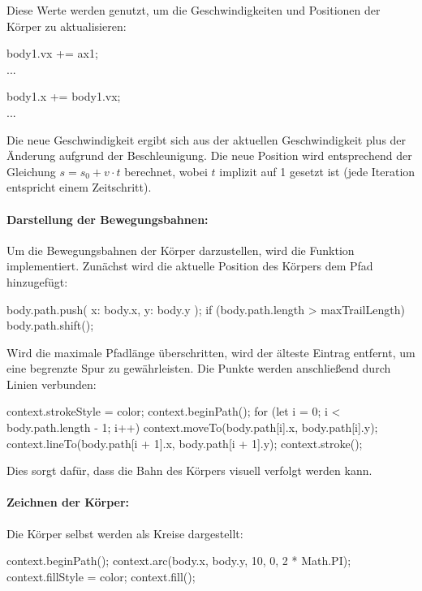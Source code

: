 \documentclass[a4paper,12pt,twoside]{article}
\begin{document}
Diese Werte werden genutzt, um die Geschwindigkeiten und Positionen der Körper zu aktualisieren:

\begin{javascript}
body1.vx += ax1;
\\...

body1.x += body1.vx;
\\...
\end{javascript}

Die neue Geschwindigkeit ergibt sich aus der aktuellen Geschwindigkeit plus der Änderung aufgrund der Beschleunigung. Die neue Position wird entsprechend der Gleichung \( s = s_0 + v \cdot t \) berechnet, wobei \( t \) implizit auf 1 gesetzt ist (jede Iteration entspricht einem Zeitschritt).

\paragraph{Darstellung der Bewegungsbahnen:}
Um die Bewegungsbahnen der Körper darzustellen, wird die Funktion  implementiert. Zunächst wird die aktuelle Position des Körpers dem Pfad hinzugefügt:

\begin{javascript}
body.path.push({ x: body.x, y: body.y });
if (body.path.length > maxTrailLength) body.path.shift();
\end{javascript}

Wird die maximale Pfadlänge überschritten, wird der älteste Eintrag entfernt, um eine begrenzte Spur zu gewährleisten. Die Punkte werden anschließend durch Linien verbunden:

\begin{javascript}
context.strokeStyle = color;
context.beginPath();
for (let i = 0; i < body.path.length - 1; i++) {
    context.moveTo(body.path[i].x, body.path[i].y);
    context.lineTo(body.path[i + 1].x, body.path[i + 1].y);
}
context.stroke();
\end{javascript}

Dies sorgt dafür, dass die Bahn des Körpers visuell verfolgt werden kann.

\paragraph{Zeichnen der Körper:}
Die Körper selbst werden als Kreise dargestellt:

\begin{javascript}
context.beginPath();
context.arc(body.x, body.y, 10, 0, 2 * Math.PI);
context.fillStyle = color;
context.fill();
\end{javascript}
\end{document}
